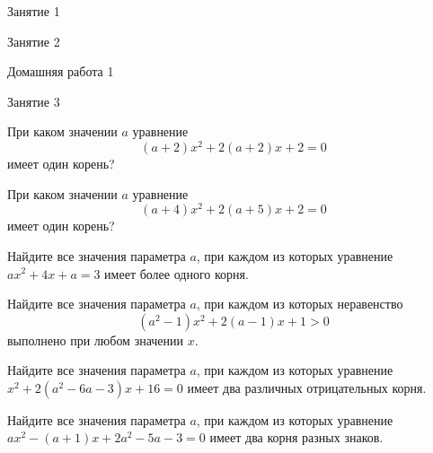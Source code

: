 %
%

\begin{class}[number=1]
	\begin{listofex}
		\item Занятие 1
	\end{listofex}
\end{class}

\begin{class}[number=2]
	\begin{listofex}
		\item Занятие 2
	\end{listofex}
\end{class}

\begin{homework}[number=1]
	\begin{listofex}
		\item Домашняя работа 1
	\end{listofex}
\end{homework}

\begin{class}[number=3]
	\begin{listofex}
		\item Занятие 3 
	\end{listofex}
\end{class}

\begin{class}[number=4]
	\begin{listofex}
		\item При каком значении \( a \) уравнение
		\[ (a+2)x^2+2(a+2)x+2=0 \]
		имеет один корень?
		\item При каком значении \( a \) уравнение
		\[ (a+4)x^2+2(a+5)x+2=0 \]
		имеет один корень?
		\item Найдите все значения параметра \( a \), при каждом из которых уравнение \( ax^2+4x+a=3 \) имеет более одного корня.
		\item Найдите все значения параметра \( a \), при каждом из которых неравенство
		\[ (a^2-1)x^2+2(a-1)x+1>0 \]
		выполнено при любом значении \( x \).
		\item Найдите все значения параметра \( a \), при каждом из которых уравнение \( x^2+2(a^2-6a-3)x+16=0 \) имеет два различных отрицательных корня.
		\item Найдите все значения параметра \( a \), при каждом из которых уравнение \( ax^2-(a+1)x+2a^2-5a-3=0 \) имеет два корня разных знаков.
	\end{listofex}
\end{class}

